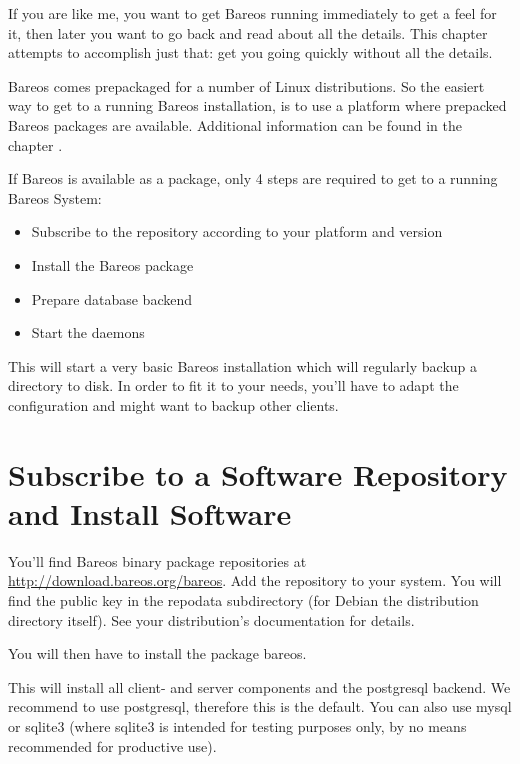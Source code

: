 If you are like me, you want to get Bareos running immediately to get a feel
for it, then later you want to go back and read about all the details. This
chapter attempts to accomplish just that: get you going quickly without all
the details.

Bareos comes prepackaged for a number of Linux distributions.
So the easiert way to get to a running Bareos installation, 
is to use a platform where prepacked Bareos packages are available.
Additional information can be found in the chapter .


If Bareos is available as a package, 
only 4 steps are required to get to a running Bareos System:
\begin{itemize}
    \item Subscribe to the repository according to your platform and version
    \item Install the Bareos package
    \item Prepare database backend
    \item Start the daemons
\end{itemize}

This will start a very basic Bareos installation which will regularly backup a directory to disk.
In order to fit it to your needs, you'll have to adapt the configuration and might want to backup other clients.

\section{Subscribe to a Software Repository and Install Software}

You'll find Bareos binary package repositories at \url{http://download.bareos.org/bareos}.
Add the repository to your system. 
You will find the public key in the repodata subdirectory 
(for Debian the distribution directory itself). 
See your distribution's documentation for details.
 
You will then have to install the package bareos. 

This will install all client- and server components and the postgresql backend. 
We recommend to use postgresql, therefore this is the default. 
You can also use mysql or sqlite3 
(where sqlite3 is intended for testing purposes only, by no means recommended for productive use).

